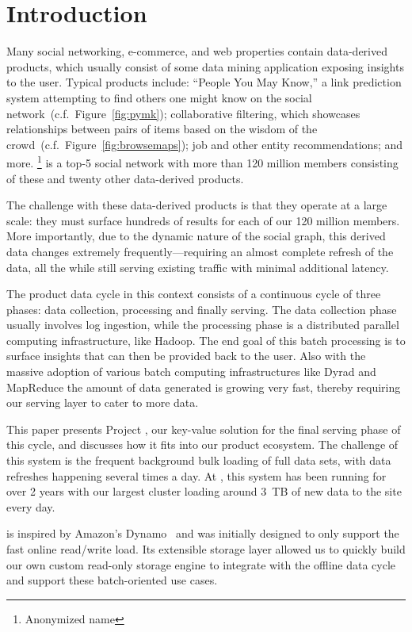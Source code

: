 \section{Introduction}
\label{sec:introduction}

Many social networking, e-commerce, and web properties contain
data-derived products, which usually consist of some data mining
application exposing insights to the user. Typical products include:
``People You May Know,'' a link prediction system attempting to find
others one might know on the social
network~(c.f.~Figure~\ref{fig:pymk}); collaborative filtering, which
showcases relationships between pairs of items based on the wisdom of
the crowd~(c.f.~Figure~\ref{fig:browsemaps}); job and other entity
recommendations; and more. \linkedin\footnote{Anonymized name} is a
top-5 social network with more than 120 million members consisting of
these and twenty other data-derived products. 

The challenge with these data-derived products is that they operate at
a large scale: they must surface hundreds of results for each of our
120 million members. More importantly, due to the dynamic nature of
the social graph, this derived data changes extremely
frequently---requiring an almost complete refresh of the data, all the
while still serving existing traffic with minimal additional latency.

The product data cycle in this context consists of a continuous cycle
of three phases: data collection, processing and finally serving. The
data collection phase usually involves log ingestion, while the
processing phase is a distributed parallel computing infrastructure,
like Hadoop. The end goal of this batch processing is to surface
insights that can then be provided back to the user. Also with the 
massive adoption of various batch computing infrastructures like 
Dyrad\cite{dyrad} and MapReduce\cite{dean} the amount of data generated 
is growing very fast, thereby requiring our serving layer to cater 
to more data. 

This paper presents Project \projectname{}, our key-value solution for
the final serving phase of this cycle, and discusses how it fits into
our product ecosystem. The challenge of this system is the frequent
background bulk loading of full data sets, with data refreshes
happening several times a day. At \linkedin, this system has been
running for over 2 years with our largest cluster loading around 3~TB
of new data to the site every day. 

\projectname{} is inspired by Amazon's Dynamo~\cite{dynamo} and was
initially designed to only support the fast online read/write load.
Its extensible storage layer allowed us to quickly build our own
custom read-only storage engine to integrate with the offline data
cycle and support these batch-oriented use cases.


